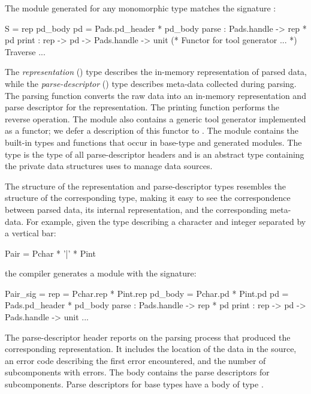 The module generated for any monomorphic \padsml{} type 
matches the signature :
\begin{code}\scriptsize
{}  S = 
   rep
   pd\_body
   pd = Pads.pd_header * pd_body
    parse : Pads.handle -> rep * pd
    print : rep -> pd -> Pads.handle -> unit
  (* Functor for tool generator ... *)
   Traverse ...
\end{code}%
\noindent 
The \emph{representation} () type describes the
in-memory representation of parsed data, while the
\emph{parse-descriptor} () type describes meta-data collected
during parsing.
The parsing function converts the raw data into an in-memory
representation and parse descriptor for the representation.
The printing function performs the reverse operation.
The module also contains a generic tool generator implemented as a functor; we defer a description of this functor to .
The module  contains the
built-in types and functions that occur in base-type and generated
modules.  The type  is the type of all parse-descriptor
headers and  is an abstract type containing the
private data structures \padsml{} uses to manage data sources.

The structure of the representation and parse-descriptor types
resembles the structure of the corresponding \padsml{} type, making it
easy to see the correspondence between parsed data, its internal
representation, and the corresponding meta-data.  
For example, given the \padsml{} type  describing a character
and integer separated by a vertical bar:
\begin{code}\scriptsize
   Pair = Pchar * '|' * Pint\end{code}%
the compiler generates a module with the signature:
\begin{code}\scriptsize
{}  Pair_sig = 
   rep     = Pchar.rep * Pint.rep
   pd_body = Pchar.pd  * Pint.pd
   pd      = Pads.pd_header * pd_body
    parse   : Pads.handle -> rep * pd
    print   : rep -> pd -> Pads.handle -> unit
  ...
\end{code}%
\noindent 
The parse-descriptor header reports on the parsing
process that produced the corresponding representation.  It includes
the location of the data in the source, an error code
describing the first error encountered, and the number of
subcomponents with errors.  The body contains the parse
descriptors for subcomponents.
Parse descriptors for base types have a body of type .

